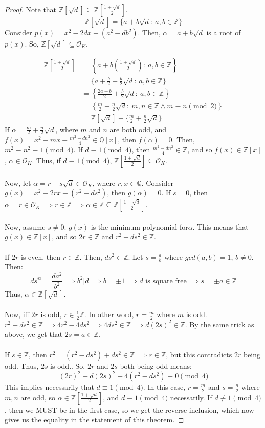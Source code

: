 \documentclass{article}
\newcommand{\air}{\mathcal{O}_K}
\newcommand{\Q}{\mathbb{Q}}
\newcommand{\Z}{\mathbb{Z}}
\begin{document}
  \begin{proof}
  Note that $\Z[\sqrt{d}]\subseteq \Z\left[\frac{1+\sqrt{d}}{2}\right]$.
  $$\Z[\sqrt{d}] = \{a+b\sqrt{d}:\ a,b\in\Z\}$$
  Consider $p(x)=x^2-2dx+(a^2-db^2)$. Then, $\alpha=a+b\sqrt{d}$ is a root of $p(x)$.  So, $\Z[\sqrt{d}]\subseteq \air$.

  \begin{align*}
      \Z\left[\frac{1+\sqrt{d}}{2}\right] &=\left\{ a+b\left(\frac{1+\sqrt{d}}{2}\right):\ a,b\in\Z\right\}\\
      &=\{a+\frac{b}{2}+\frac{b}{2}\sqrt{d}:\ a,b\in\Z\}\\
      &=\left\{\frac{2a+b}{2}+\frac{b}{2}\sqrt{d}:\ a,b\in\Z\right\}\\
      &=\left\{\frac{m}{2}+\frac{n}{2}\sqrt{d}:\ m,n\in\Z\wedge m\equiv n\pmod{2} \right\}\\
      &=\Z[\sqrt{d}]+\{\frac{m}{2}+\frac{n}{2}\sqrt{d}\}
  \end{align*}
  If $\alpha=\frac{m}{2}+\frac{n}{2}\sqrt{d}$, where $m$ and $n$ are both odd, and $f(x)=x^2-mx-\frac{m^2-dn^2}{4}\in\Q[x]$, then $f(\alpha)=0$. Then, $m^2\equiv n^2\equiv 1\pmod{4}$. 
  If $d\equiv 1\pmod{4}$, then $\frac{m^2-dn^2}{4}\in\Z$, and so $f(x)\in\Z[x]$, $\alpha\in\air$. Thus, if $d\equiv 1\pmod{4}$, $\Z\left[\frac{1+\sqrt{d}}{2}\right]\subseteq \air$.\\
  \\
  Now, let $\alpha=r+s\sqrt{d}\in\air$, where $r,x\in\Q$. Consider $g(x)=x^2-2rx+(r^2-ds^2)$, then $g(\alpha)=0$. If $s=0$, then $\alpha=r\in\air\implies r\in\Z\implies \alpha\in\Z\subseteq \Z\left[\frac{1+\sqrt{d}}{2}\right]$. \\
  \\
  Now, assume $s\neq 0$. $g(x)$ is the minimum polynomial for$\alpha$. This means that $ g(x)\in\Z[x]$, and so $2r\in\Z$ and $r^2-ds^2\in\Z$.\\
  \\
  If $2r$ is even, then $r\in\Z$. Then, $ds^2\in\Z$. Let $s=\frac{a}{b}$ where $gcd(a,b)=1$, $b\neq 0$. Then:
  $$ds^@=\frac{da^2}{b^2}\implies b^2|d\implies b=\pm 1\implies \text{$d$ is square free}\implies s=\pm a\in\Z$$
  Thus, $\alpha\in\Z[\sqrt{d}]$.\\
  \\
  Now, iff $2r$ is odd, $r\in\frac{1}{2}\Z$. In other word, $r=\frac{m}{2}$ where $m$ is odd. $r^2-ds^2\in\Z\implies 4r^2-4ds^2\implies 4ds^2\in\Z\implies d(2s)^2\in\Z$. By the same trick as above, we get that $2s=a\in\Z$. \\
  \\
  If $s\in\Z$, then $r^2=(r^2-ds^2)+ds^2\in\Z\implies r\in\Z$, but this contradicts $2r$ being odd. Thus, $2s$ is odd.. So, $2r$ and $2s$ both being odd means:
$$(2r)^2-d(2s)^2-4(r^2-ds^2)\equiv 0\pmod{4}$$
    This implies necessarily that $d\equiv 1\pmod{4}$. In this case, $r=\frac{m}{2}$ and $s=\frac{n}{2}$ where $m,n$ are odd, so $\alpha\in\Z\left[\frac{1+\sqrt{d}}{2}\right]$, and $d\equiv 1\pmod {4}$ necessarily. If $d\not\equiv 1\pmod{4}$, then we MUST be in the first case, so we get the reverse inclusion, which now gives us the equality in the statement of this theorem.
      \end{proof}
\end{document}
